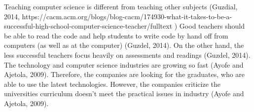 \documentclass{sigchi}
\begin{document}
Teaching computer science is different from teaching other subjects (Guzdial, 2014, https://cacm.acm.org/blogs/blog-cacm/174930-what-it-takes-to-be-a-successful-high-school-computer-science-teacher/fulltext ) Good teachers should be able to read the code and help students to write code by hand off from computers (as well as at the computer) (Guzdel, 2014). On the other hand, the less successful teachers focus heavily on assessments and readings (Guzdel, 2014). \\
The technology and computer science industries are growing so fast (Ayofe and Ajetola, 2009). Therefore, the companies are looking for the graduates, who are able to use the latest technologies. However, the companies criticize the universities curriculum doesn’t meet the practical issues in industry (Ayofe and Ajetola, 2009). 



\balance{}

\balance{}



\end{document}

